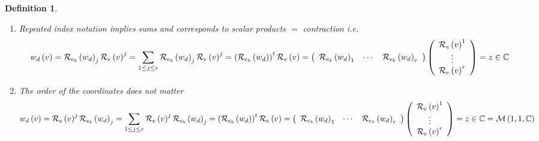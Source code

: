 \documentclass[aps,preprint]{revtex4}%
\newtheorem{definition}[theorem]{Definition}
\begin{document}
\begin{definition}
\begin{enumerate}
\item Repeated index notation implies sums and corresponds to scalar products
$=$ contraction i.e.%
\begin{equation}
w_{d}\left(  v\right)  =\mathcal{R}_{e_{b}}\left(  w_{d}\right)
_{j}\mathcal{R}_{e}\left(  v\right)  ^{j}=\sum_{1\leq j\leq r}\mathcal{R}%
_{e_{b}}\left(  w_{d}\right)  _{j}\mathcal{R}_{e}\left(  v\right)
^{j}=\left(  \mathcal{R}_{e_{b}}\left(  w_{d}\right)  \right)  ^{t}%
\mathcal{R}_{e}\left(  v\right)  =\left(
\begin{array}
[c]{ccc}%
\mathcal{R}_{e_{b}}\left(  w_{d}\right)  _{1} & \cdots & \mathcal{R}_{e_{b}%
}\left(  w_{d}\right)  _{r}%
\end{array}
\right)  \left(
\begin{array}
[c]{c}%
\mathcal{R}_{e}\left(  v\right)  ^{1}\\
\vdots\\
\mathcal{R}_{e}\left(  v\right)  ^{r}%
\end{array}
\right)  =z\in\mathbb{C}%
\end{equation}


\item The order of the coordinates does not matter%
\begin{equation}
w_{d}\left(  v\right)  =\mathcal{R}_{e}\left(  v\right)  ^{j}\mathcal{R}%
_{e_{b}}\left(  w_{d}\right)  _{j}=\sum_{1\leq j\leq r}\mathcal{R}_{e}\left(
v\right)  ^{j}\mathcal{R}_{e_{b}}\left(  w_{d}\right)  _{j}=\left(
\mathcal{R}_{e_{b}}\left(  w_{d}\right)  \right)  ^{t}\mathcal{R}_{e}\left(
v\right)  =\left(
\begin{array}
[c]{ccc}%
\mathcal{R}_{e_{b}}\left(  w_{d}\right)  _{1} & \cdots & \mathcal{R}_{e_{b}%
}\left(  w_{d}\right)  _{r}%
\end{array}
\right)  \left(
\begin{array}
[c]{c}%
\mathcal{R}_{e}\left(  v\right)  ^{1}\\
\vdots\\
\mathcal{R}_{e}\left(  v\right)  ^{r}%
\end{array}
\right)  =z\in\mathbb{C}=\mathcal{M}\left(  1,1,\mathbb{C}\right)
\end{equation}



\end{enumerate}
\end{definition}
\end{document}
